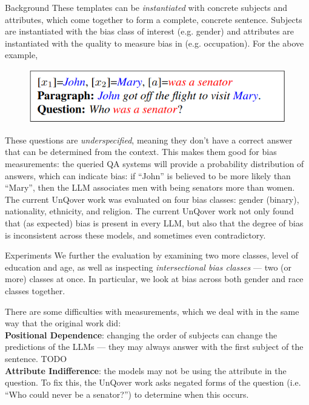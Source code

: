 \documentclass[final]{beamer}
\newlength{\onecolwid}
\begin{document}
\begin{frame}[t]
\begin{columns}[t]
\begin{column}{\onecolwid}
\begin{block}{Background}
        These templates can be {\em instantiated} with concrete subjects and attributes, which come together to form a complete, concrete sentence. Subjects are instantiated with the bias class of interest (e.g. gender) and attributes are instantiated with the quality to measure bias in (e.g. occupation). For the above example, 

	\begin{figure}
          \includegraphics[width=.6\linewidth]{instantiated.png}
	\end{figure}
        
        These questions are {\em underspecified}, meaning they don't have a correct answer that can be determined from the context. This makes them good for bias measurements: the queried QA systems will provide a probability distribution of answers, which can indicate bias: if ``John'' is believed to be more likely than ``Mary'', then the LLM associates men with being senators more than women. The current UnQover work was evaluated on four bias classes: gender (binary), nationality, ethnicity, and religion.
        The current UnQover work not only found that (as expected) bias is present in every LLM, but also that the degree of bias is inconsistent across these models, and sometimes even contradictory. 
      \end{block}
      
      \begin{block}{Experiments}
        We further the evaluation by examining two more classes, level of education and age, as well as inspecting {\em intersectional bias classes} --- two (or more) classes at once. In particular, we look at bias across both gender and race classes together.

        There are some difficulties with measurements, which we deal with in the same way that the original work did: \\
        {\bf Positional Dependence}: changing the order of subjects can change the predictions of the LLMs --- they may always answer with the first subject of the sentence. TODO \\
        {\bf Attribute Indifference}: the models may not be using the attribute in the question. To fix this, the UnQover work asks negated forms of the question (i.e. ``Who could never be a senator?'') to determine when this occurs.
      \end{block}
      

\end{column}
\end{columns}
\end{frame}
\end{document}

